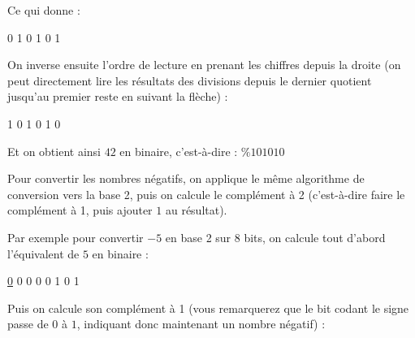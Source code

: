 \documentclass[11pt,a4paper]{article}
\begin{document}
Ce qui donne :

\smallskip

{ 0 \hspace*{0.2cm} 1 \hspace*{0.2cm} 0 \hspace*{0.2cm} 1 \hspace*{0.2cm} 0 \hspace*{0.2cm} 1 }

\smallskip

On inverse ensuite l'ordre de lecture en prenant les chiffres depuis la droite (on peut directement lire les résultats des divisions depuis le dernier quotient jusqu'au premier reste en suivant la flèche) :

\smallskip

{ 1 \hspace*{0.2cm} 0 \hspace*{0.2cm} 1 \hspace*{0.2cm} 0 \hspace*{0.2cm} 1 \hspace*{0.2cm} 0 }

\smallskip

Et on obtient ainsi $ 42 $ en binaire, c'est-à-dire : $ \% 101010 $


\bigskip


Pour convertir les nombres négatifs, on applique le même algorithme de conversion vers la base 2, puis on calcule le complément à 2 (c'est-à-dire faire le complément à 1, puis ajouter $ 1 $ au résultat).

\bigskip

Par exemple pour convertir $ -5 $ en base 2 sur 8 bits, on calcule tout d'abord l'équivalent de $ 5 $ en binaire :

\medskip

{ \underline{0} \hspace*{0.2cm} 0 \hspace*{0.2cm} 0 \hspace*{0.2cm} 0 \hspace*{0.2cm} 0 \hspace*{0.2cm} 1 \hspace*{0.2cm} 0 \hspace*{0.2cm} 1 }

\medskip

Puis on calcule son complément à 1 (vous remarquerez que le bit codant le signe passe de $ 0 $ à $ 1 $, indiquant donc maintenant un nombre négatif) :

\medskip
\end{document}
